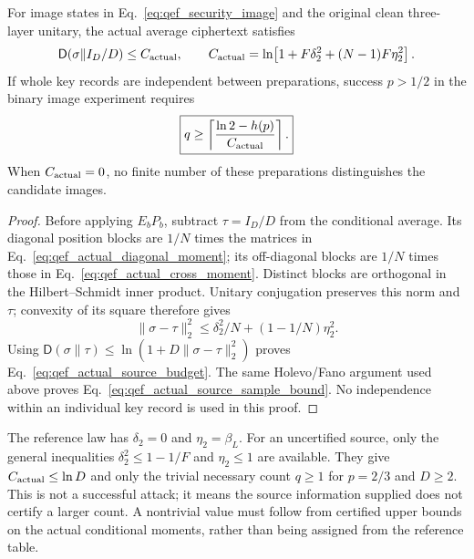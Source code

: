 {\begin{theorem}
\label{thm:qef_actual_source_moments}
For image states in Eq.~\eqref{eq:qef_security_image} and the original
clean three-layer unitary, the actual average ciphertext satisfies
\begin{equation}
 \mathsf D(\sigma\|I_D/D)\leq C_{\rm actual},\qquad
 C_{\rm actual}=\ln\!\left[1+F\delta_2^2+(N-1)F\eta_2^2\right].
 \label{eq:qef_actual_source_budget}
\end{equation}
If whole key records are independent between preparations, success
$p>1/2$ in the binary image experiment requires
\begin{equation}
 \boxed{\displaystyle q\geq
 \left\lceil\frac{\ln2-h(p)}{C_{\rm actual}}\right\rceil.}
 \label{eq:qef_actual_source_sample_bound}
\end{equation}
When $C_{\rm actual}=0$, no finite number of these preparations
distinguishes the candidate images.
\end{theorem}
\begin{proof}
Before applying $E_bP_b$, subtract $\tau=I_D/D$ from the conditional
average. Its diagonal position blocks are $1/N$ times the matrices in
Eq.~\eqref{eq:qef_actual_diagonal_moment}; its off-diagonal blocks are
$1/N$ times those in Eq.~\eqref{eq:qef_actual_cross_moment}.
Distinct blocks are orthogonal in the Hilbert--Schmidt inner product.
Unitary conjugation preserves this norm and $\tau$; convexity of its
square therefore gives
\begin{equation}
 \|\sigma-\tau\|_2^2
 \leq\delta_2^2/N+(1-1/N)\eta_2^2.
\end{equation}
Using $\mathsf D(\sigma\|\tau)\leq
\ln(1+D\|\sigma-\tau\|_2^2)$ proves
Eq.~\eqref{eq:qef_actual_source_budget}. The same Holevo/Fano argument
used above proves Eq.~\eqref{eq:qef_actual_source_sample_bound}.
No independence within an individual key record is used in this proof.
\end{proof}

The reference law has $\delta_2=0$ and $\eta_2=\beta_L$.
For an uncertified source, only the general inequalities
$\delta_2^2\leq1-1/F$ and $\eta_2\leq1$ are available. They give
$C_{\rm actual}\leq\ln D$ and only the trivial necessary count
$q\geq1$ for $p=2/3$ and $D\geq2$. This is not a successful attack;
it means the source information supplied does not certify a larger
count. A nontrivial value must follow from certified upper bounds on
the actual conditional moments, rather than being assigned from the
reference table.

}
